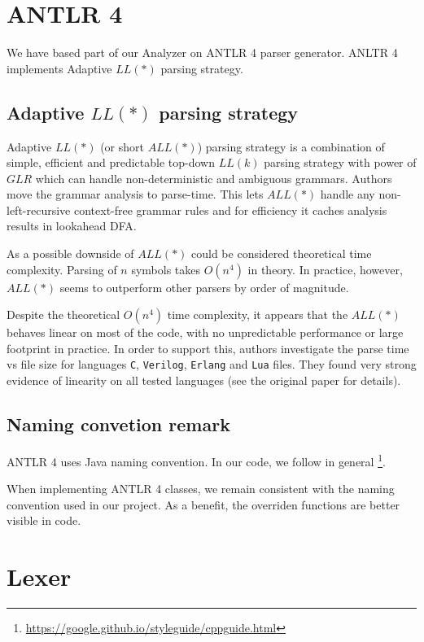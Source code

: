 

\section{ANTLR 4}
We have based part of our Analyzer on ANTLR 4 parser generator. ANLTR 4 implements Adaptive $LL(*)$ \cite{parr2014adaptive} parsing strategy.

\subsection{Adaptive $LL(*)$ parsing strategy}
Adaptive $LL(*)$ (or short $ALL(*)$) parsing strategy is a combination of simple, efficient and predictable top-down $LL(k)$ parsing strategy with power of $GLR$ which can handle non-deterministic and ambiguous grammars. 
Authors move the grammar analysis to parse-time. This lets $ALL(*)$ handle any non-left-recursive context-free grammar rules and for efficiency it caches analysis results in lookahead DFA.

As a possible downside of $ALL(*)$ could be considered theoretical time complexity. Parsing of $n$ symbols takes $O(n^4)$ in theory. In practice, however, $ALL(*)$ seems to outperform other parsers by order of magnitude.

Despite the theoretical $O(n^4)$ time complexity, it appears that the $ALL(*)$ behaves linear on most of the code, with no unpredictable performance or large footprint in practice. In order to support this, authors investigate the parse time vs file size for languages \texttt{C}, \texttt{Verilog}, \texttt{Erlang} and \texttt{Lua} files. They found very strong evidence of linearity on all tested languages (see the original paper for details).

\subsection{Naming convetion remark}
ANTLR 4 uses Java naming convention. In our code, we follow in general \footnote{\url{https://google.github.io/styleguide/cppguide.html}}. 

When implementing ANTLR 4 classes, we remain consistent with the naming convention used in our project. As a benefit, the overriden functions are better visible in code.

\section{Lexer}

